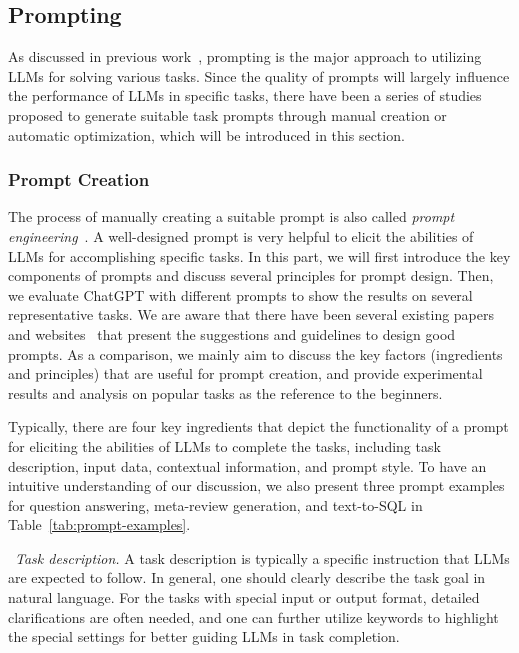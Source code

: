 \subsection{Prompting}
As discussed in previous work~\cite{Liu-survey-2023-Pre-train}, prompting is the major approach to utilizing LLMs for solving various tasks. 
Since the quality of prompts will largely influence the  performance of LLMs in specific tasks, there have been a series of studies proposed to generate suitable task prompts through manual creation or automatic optimization, which will be introduced in this section.



\subsubsection{Prompt Creation}\label{subsec:promptdesign}
The process of manually creating a suitable prompt is also called \emph{prompt engineering}~\cite{Liu-arxiv-2022-Design,White-arxiv-2023-Prompt}. 
A well-designed prompt is very helpful to elicit the abilities of LLMs for accomplishing specific tasks.
In this part, we will first introduce the key components of prompts and discuss several principles for prompt design. Then, we evaluate ChatGPT with different prompts to show the results on several representative tasks. 
We are aware that there have been several existing papers~\cite{Santu-arxiv-2023-TELeR,White-arxiv-2023-Prompt} and websites~\cite{OpenAI-OpenAI-2023-PromptGuide,Contributors-AIShort-2023-AIShort,Contributors-Github-2023-Awesome} that present the suggestions and guidelines to design good prompts. 
As a comparison, we mainly aim to discuss the key factors (ingredients and principles) that are useful for prompt creation, and provide experimental results and analysis on popular tasks as the reference to the beginners. 


Typically, there are four key ingredients that {depict the functionality of a  prompt for eliciting the abilities of LLMs to complete the tasks}, including task description, input data, contextual information, and prompt  style. To have an intuitive understanding of our discussion, we also present three prompt examples for question answering, meta-review generation, and text-to-SQL    in Table~\ref{tab:prompt-examples}.


\textbullet~\emph{Task description.}
A task description is typically a specific instruction that LLMs are expected to follow. 
In general, one  should clearly describe the task goal  in natural language. 
For the tasks with special input or output format, detailed clarifications are often needed, and one can further utilize keywords to highlight the special settings for better guiding LLMs in task completion. 



